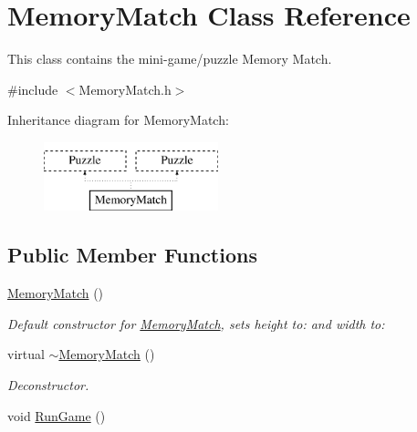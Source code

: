 \hypertarget{classMemoryMatch}{\section{Memory\-Match Class Reference}
\label{classMemoryMatch}
}


This class contains the mini-\/game/puzzle Memory Match.  




{\ttfamily \#include $<$Memory\-Match.\-h$>$}

Inheritance diagram for Memory\-Match\-:\begin{figure}[H]
\begin{center}
\leavevmode
\includegraphics[height=2.000000cm]{classMemoryMatch}
\end{center}
\end{figure}
\subsection*{Public Member Functions}
\begin{DoxyCompactItemize}
\item 
\hyperlink{classMemoryMatch_a7221a0b7d33bf079df51c1f7f52aa2dd}{Memory\-Match} ()
\begin{DoxyCompactList}\small\item\em Default constructor for \hyperlink{classMemoryMatch}{Memory\-Match}, sets height to\-: and width to\-: \end{DoxyCompactList}\item 
virtual \hyperlink{classMemoryMatch_a1b2cf5418b2b26e21b4fd12d880e79b7}{$\sim$\-Memory\-Match} ()
\begin{DoxyCompactList}\small\item\em Deconstructor. \end{DoxyCompactList}\item 
void \hyperlink{classMemoryMatch_a3973ebb1ab8d44a51bd629bc3b0df370}{Run\-Game} ()
\end{DoxyCompactItemize}
